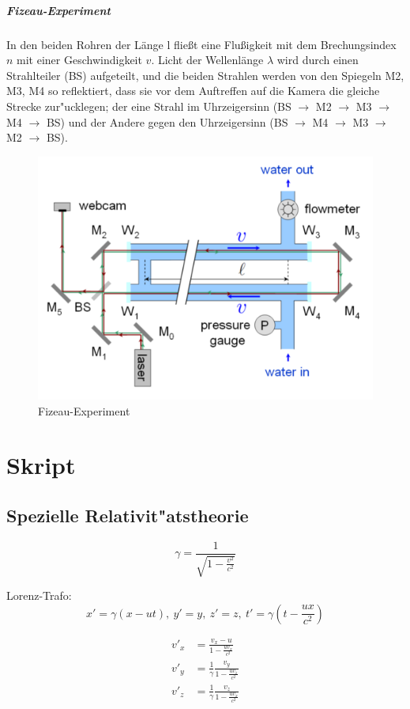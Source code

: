 \documentclass[12pt]{report}
\begin{document}
\paragraph{Fizeau-Experiment}

In den beiden Rohren der Länge l fließt eine Flußigkeit mit dem Brechungsindex $n$ mit einer Geschwindigkeit $v$. Licht der Wellenlänge $\lambda$ wird durch einen Strahlteiler (BS) aufgeteilt, und die beiden Strahlen werden von den Spiegeln M2, M3, M4 so reflektiert, dass sie vor dem Auftreffen auf die Kamera die gleiche Strecke zur"ucklegen; der eine Strahl im Uhrzeigersinn (BS $\to$ M2 $\to$ M3 $\to$ M4 $\to$ BS) und der Andere gegen den Uhrzeigersinn (BS $\to$ M4 $\to$ M3 $\to$ M2 $\to$ BS).

\begin{figure}
\centering
\includegraphics[width=.8\textwidth]{Fizz}
\caption{Fizeau-Experiment}
\label{fizz}
\end{figure}


\chapter{Skript}

\section{Spezielle Relativit"atstheorie}

\[\gamma=\frac{1}{\sqrt{1-\frac{v^2}{c^2}}}\]

Lorenz-Trafo:
\[x'=\gamma(x-ut),\ y'=y,\ z'=z,\ t'=\gamma\left(t-\frac{ux}{c^2}\right)\]

\begin{align*}
v'_x&=\frac{v_x-u}{1-\frac{uv_x}{c^2}}\\
v'_y&=\frac{1}{\gamma}\frac{v_y}{1-\frac{uv_z}{c^2}}\\
v'_z&=\frac{1}{\gamma}\frac{v_z}{1-\frac{uv_x}{c^2}}
\end{align*}
\end{document}
